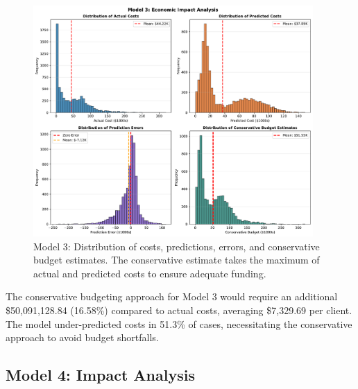 \begin{figure}[htbp]
\centering
\includegraphics[width=0.95\textwidth]{figures/model_3_Impact_Histograms.pdf}
\caption{Model 3: Distribution of costs, predictions, errors, and conservative budget estimates. The conservative estimate takes the maximum of actual and predicted costs to ensure adequate funding.}
\label{fig:model3_impact_histograms}
\end{figure}

The conservative budgeting approach for Model 3 would require an additional \$50,091,128.84 (16.58\%) compared to actual costs, averaging \$7,329.69 per client. The model under-predicted costs in 51.3\% of cases, necessitating the conservative approach to avoid budget shortfalls.

\clearpage

\subsection{Model 4: Impact Analysis}
\label{subsec:model4_impact}

